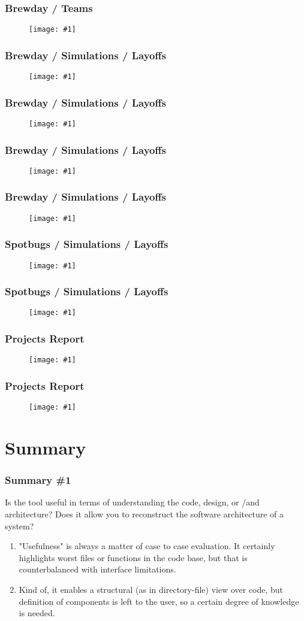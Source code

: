 \documentclass{beamer}
\newcommand{\putimage}[2] {
\begin{figure}[H]
  \centering
  \texttt{[image: \#1]}
\end{figure}
}
\begin{document}
\begin{frame}
  \frametitle{Brewday / Teams}
  \putimage{img/brewday-teams-7.png}{0.99}
\end{frame}

\begin{frame}
  \frametitle{Brewday / Simulations / Layoffs}
  \putimage{img/brewday-layoffs-1.png}{0.99}
\end{frame}

\begin{frame}
  \frametitle{Brewday / Simulations / Layoffs}
  \putimage{img/brewday-layoffs-2.png}{0.99}
\end{frame}

\begin{frame}
  \frametitle{Brewday / Simulations / Layoffs}
  \putimage{img/brewday-layoffs-3.png}{0.99}
\end{frame}

\begin{frame}
  \frametitle{Brewday / Simulations / Layoffs}
  \putimage{img/brewday-layoffs-4.png}{0.99}
\end{frame}

\begin{frame}
  \frametitle{Spotbugs / Simulations / Layoffs}
  \putimage{img/spotbugs-layoffs-1.png}{0.99}
\end{frame}

\begin{frame}
  \frametitle{Spotbugs / Simulations / Layoffs}
  \putimage{img/spotbugs-layoffs-2.png}{0.99}
\end{frame}

\begin{frame}
  \frametitle{Projects Report}
  \putimage{img/spotbugs-report-1.png}{0.99}
\end{frame}

\begin{frame}
  \frametitle{Projects Report}
  \putimage{img/spotbugs-report-2.png}{0.99}
\end{frame}

\section{Summary}

\begin{frame}
  \frametitle{Summary \#1}
  Is the tool useful in terms of understanding the code, design, or /and architecture? Does it allow you to reconstruct the software architecture of a system?
  \begin{enumerate}
    \item "Usefulness" is always a matter of case to case evaluation. It certainly highlights worst files or functions in the code base, but that is counterbalanced with interface limitations.
    \item Kind of, it enables a structural (as in directory-file) view over code, but definition of components is left to the user, so a certain degree of knowledge is needed.
  \end{enumerate}
\end{frame}
\end{document}
